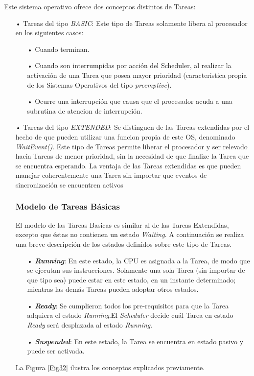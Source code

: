 \documentclass[12pt,letterpaper]{article}
\begin{document}
Este sistema operativo ofrece dos conceptos distintos de Tareas:
\begin{enumerate}
\item[•]Tareas del tipo \emph{BASIC}: Este tipo de Tareas solamente libera al procesador en los siguientes casos:
\begin{enumerate}
\item[•]Cuando terminan.
\item[•]Cuando son interrumpidas por acción del Scheduler, al realizar la activación de una Tarea que posea mayor prioridad (caracteristica propia de los Sistemas Operativos del tipo \textit{preemptive}).
\item[•]Ocurre una interrupción que causa que el procesador acuda a una subrutina de atencion de interrupción.
\end{enumerate}
\item[•]Tareas del tipo \emph{EXTENDED}: Se distinguen de las Tareas extendidas por el hecho de que pueden utilizar una funcion propia de este OS, denominado \textit{WaitEvent()}. Este tipo de Tareas permite liberar el procesador y ser relevado hacia Tareas de menor prioridad, sin la necesidad de que finalize la Tarea que se encuentra esperando.
La ventaja de las Tareas extendidas es que pueden manejar coherentemente una Tarea sin importar que eventos de sincronización se encuentren activos%
\subsubsection{Modelo de Tareas Básicas}
El modelo de las Tareas Basicas es similar al de las Tareas Extendidas, excepto que éstas no contienen un estado \textit{Waiting}. A continuación se realiza una breve descripción de los estados definidos sobre este tipo de Tareas.
\begin{enumerate}
\item[•]\textbf{\emph{Running}}: En este estado, la CPU es asignada a la Tarea, de modo que se ejecutan sus instrucciones. Solamente una sola Tarea (sin importar de que tipo sea) puede estar en este estado, en un instante determinado; mientras las demás Tareas pueden adoptar otros estados.
\item[•]\textbf{\emph{Ready}}: Se cumplieron todos los pre-requisitos para que la Tarea adquiera el estado \textit{Running}.El \textit{Scheduler} decide cuál Tarea en estado \textit{Ready} será desplazada al estado \textit{Running}.
\item[•]\textbf{\emph{Suspended}}: En este estado, la Tarea se encuentra en estado pasivo y puede ser activada.
\end{enumerate}
La Figura \ref{Fig32} ilustra los conceptos explicados previamente.


\end{enumerate}
\end{document}
